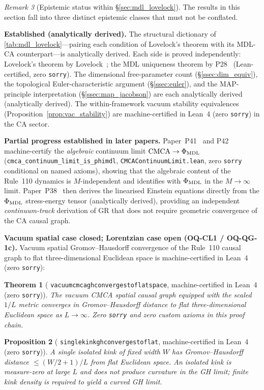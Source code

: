 \documentclass[11pt]{article}
\newtheorem{theorem}{Theorem}[section]
\newtheorem{proposition}[theorem]{Proposition}
\theoremstyle{remark}
\newtheorem{remark}[theorem]{Remark}
\newcommand{\lean}[1]{%
  \penalty-100
  \begingroup\def\_{\textunderscore\allowbreak}\texttt{#1}\endgroup}
\newcommand{\CatAL}{machine-certified in Lean~4 (zero \texttt{sorry})}
\newcommand{\CatAD}{analytically derived}
\begin{document}
\begin{remark}[Epistemic status within \S\ref{sec:mdl_lovelock}]
\label{rem:mdl_lovelock_status}
The results in this section fall into three distinct epistemic classes that
must not be conflated.

\textbf{Established (\CatAD{}).}
The structural dictionary of \cref{tab:mdl_lovelock}---pairing each
condition of Lovelock's theorem with its MDL-CA counterpart---is
analytically derived.
Each side is proved independently: Lovelock's theorem by
Lovelock~\cite{Lovelock1971}; the MDL uniqueness theorem by
P28~\cite{SpivackCompUniversality} (Lean-certified, zero \texttt{sorry}).
The dimensional free-parameter count (\S\ref{ssec:dim_equiv}), the
topological Euler-characteristic argument (\S\ref{ssec:euler}), and the
MAP-principle interpretation (\S\ref{ssec:map_jacobson}) are each
analytically derived (\CatAD{}).
The within-framework vacuum stability equivalences
(Proposition~\ref{prop:vac_stability}) are \CatAL{} in the CA sector.

\textbf{Partial progress established in later papers.}
Paper~P41~\cite{SpivackCMCA} and P42~\cite{SpivackPhiMDLField}
machine-certify the \emph{algebraic} continuum limit
$\mathrm{CMCA} \to \Phi_{\rm MDL}$
(\texttt{cmca\_continuum\_limit\_is\_phimdl},
\texttt{CMCAContinuumLimit.lean}, zero \texttt{sorry} conditional on named
axioms), showing that the algebraic content of the Rule~110 dynamics is
$M$-independent and identifies with $\Phi_{\rm MDL}$ in the $M \to \infty$
limit.
Paper~P38~\cite{SpivackPhiMDLGravity} then derives the linearised Einstein
equations directly from the $\Phi_{\rm MDL}$ stress-energy tensor
(\CatAD{}), providing an independent \emph{continuum-track} derivation of GR
that does not require geometric convergence of the CA causal graph.

\textbf{Vacuum spatial case closed; Lorentzian case open (OQ-CL1 / OQ-QG-1c).}
Vacuum spatial Gromov--Hausdorff convergence of the Rule~110 causal graph to flat
three-dimensional Euclidean space is \CatAL{}:

\begin{theorem}[\lean{vacuum\_cmca\_gh\_converges\_to\_flat\_space}, \CatAL]
\label{thm:vacuum_gh_p36}
The vacuum CMCA spatial causal graph equipped with the scaled $1/L$ metric converges
in Gromov--Hausdorff distance to flat three-dimensional Euclidean space as $L\to\infty$.
Zero \texttt{sorry} and zero custom axioms in this proof chain.
\end{theorem}

\begin{proposition}[\lean{single\_kink\_gh\_converges\_to\_flat}, \CatAL]
\label{prop:single_kink_p36}
A single isolated kink of fixed width $W$ has Gromov--Hausdorff distance
$\leq (W/2+1)/L$ from flat Euclidean space. An isolated kink is measure-zero at large
$L$ and does not produce curvature in the GH limit; finite kink density is required
to yield a curved GH limit.
\end{proposition}


\end{remark}
\end{document}
